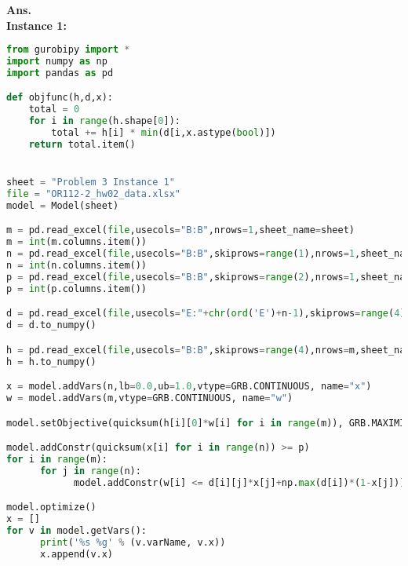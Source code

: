 \documentclass[12pt]{article}
\begin{document}
\begin{enumerate}
\begin{enumerate}
                        \textbf{Ans.}\\
                        \textbf{Instance 1:}
                        \begin{lstlisting}[language=Python]
from gurobipy import *
import numpy as np
import pandas as pd

def objfunc(h,d,x):
    total = 0
    for i in range(h.shape[0]):
        total += h[i] * min(d[i,x.astype(bool)])
    return total.item()


sheet = "Problem 3 Instance 1"
file = "OR112-2_hw02_data.xlsx"
model = Model(sheet)

m = pd.read_excel(file,usecols="B:B",nrows=1,sheet_name=sheet)
m = int(m.columns.item())
n = pd.read_excel(file,usecols="B:B",skiprows=range(1),nrows=1,sheet_name=sheet)
n = int(n.columns.item())
p = pd.read_excel(file,usecols="B:B",skiprows=range(2),nrows=1,sheet_name=sheet)
p = int(p.columns.item())

d = pd.read_excel(file,usecols="E:"+chr(ord('E')+n-1),skiprows=range(4),nrows=m,sheet_name=sheet)
d = d.to_numpy()

h = pd.read_excel(file,usecols="B:B",skiprows=range(4),nrows=m,sheet_name=sheet)
h = h.to_numpy()

x = model.addVars(n,lb=0.0,ub=1.0,vtype=GRB.CONTINUOUS, name="x")
w = model.addVars(m,vtype=GRB.CONTINUOUS, name="w")

model.setObjective(quicksum(h[i][0]*w[i] for i in range(m)), GRB.MAXIMIZE)

model.addConstr(quicksum(x[i] for i in range(n)) >= p)
for i in range(m):
      for j in range(n):
            model.addConstr(w[i] <= d[i][j]*x[j]+np.max(d[i])*(1-x[j]))

model.optimize()
x = []
for v in model.getVars():
      print('%s %g' % (v.varName, v.x))
      x.append(v.x)


\end{lstlisting}
\end{enumerate}
\end{enumerate}
\end{document}
